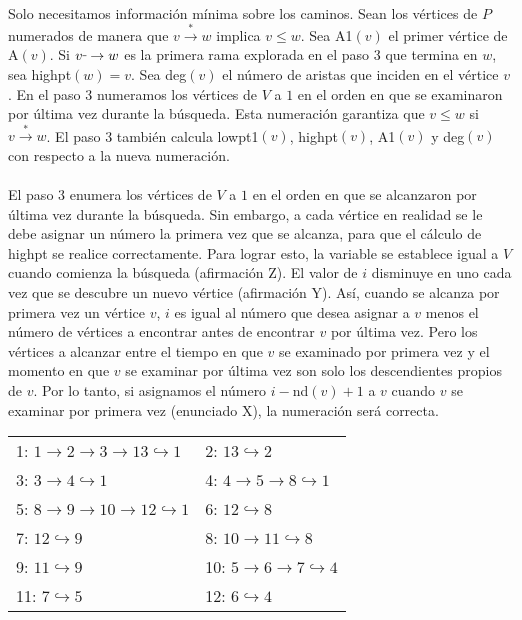\paragraph{}
Solo necesitamos información mínima sobre los caminos. Sean los vértices de $P$ numerados de manera que $v \overset{\ast}{\rightarrow} w$ implica $v \leq w$. Sea A1$\left(v\right)$ el primer vértice de A$\left(v\right)$. Si $v \rule[1mm]{.1cm}{0.4pt} \rightarrow w$ es la primera rama explorada en el paso 3 que termina en $w$, sea highpt$(w) = v$. Sea deg$\left(v\right)$ el número de aristas que inciden en el vértice $v$. En el paso 3  numeramos los vértices de $V$ a $1$ en el orden en que se examinaron por última vez durante la búsqueda. Esta numeración garantiza que $v \le w$ si $v \overset{\ast}{\rightarrow} w$. El paso 3 también calcula lowpt1$\left(v\right)$, highpt$\left(v\right)$, A1$\left(v\right)$ y deg$\left(v\right)$ con respecto a la nueva numeración.

\paragraph{}
El paso 3 enumera los vértices de $V$ a $1$ en el orden en que se alcanzaron por última vez durante la búsqueda. Sin embargo, a cada vértice en realidad se le debe asignar un número la primera vez que se alcanza, para que el cálculo de highpt se realice correctamente. Para lograr esto, la variable se establece igual a $V$ cuando comienza la búsqueda (afirmación Z). El valor de $i$ disminuye en uno cada vez que se descubre un nuevo vértice (afirmación Y). Así, cuando se alcanza por primera vez un vértice $v$, $i$ es igual al número que desea asignar a $v$ menos el número de vértices a encontrar antes de encontrar $v$ por última vez. Pero los vértices a alcanzar entre el tiempo en que $v$ se examinado por primera vez y el momento en que $v$ se examinar por última vez son solo los descendientes propios de $v$. Por lo tanto, si asignamos el número $i - $nd$\left(v\right) + 1$ a $v$ cuando $v$ se examinar por primera vez (enunciado X), la numeración será correcta.

\begin{tabular}[t]{ll}
1: $1 \rightarrow 2 \rightarrow 3 \rightarrow 13 \hookrightarrow 1$ & 2: $13 \hookrightarrow 2$ \\
3: $3 \rightarrow 4 \hookrightarrow 1$ & 4: $4 \rightarrow 5 \rightarrow 8 \hookrightarrow 1$\\
5: $8 \rightarrow 9 \rightarrow 10 \rightarrow 12 \hookrightarrow 1$ & 6: $12 \hookrightarrow 8$\\
7: $12 \hookrightarrow 9$ & 8: $10 \rightarrow 11 \hookrightarrow 8$\\
9: $11 \hookrightarrow 9$ & 10: $5 \rightarrow 6 \rightarrow 7 \hookrightarrow 4$\\
11: $7 \hookrightarrow 5$ & 12: $6 \hookrightarrow 4$
\end{tabular}\\

